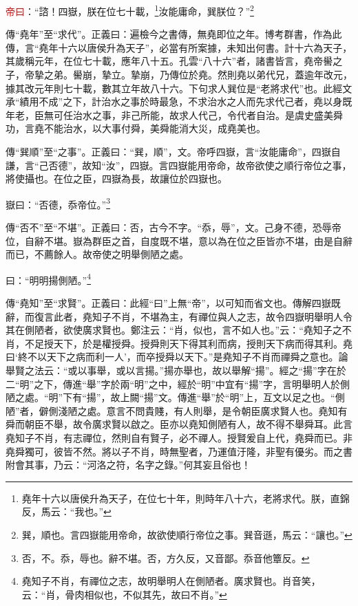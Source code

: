 \textcolor{red}{帝曰}：“諮！四嶽，朕在位七十載，\footnote{堯年十六以唐侯升為天子，在位七十年，則時年八十六，老將求代。朕，直錦反，馬云：“我也。”}汝能庸命，巽朕位？”\footnote{巽，順也。言四嶽能用帝命，故欲使順行帝位之事。巽音遜，馬云：“讓也。”}

{\noindent\zhuan{}\fzbyks 傳“堯年”至“求代”。正義曰：遍檢今之書傳，無堯即位之年。博考群書，作為此傳，言“堯年十六以唐侯升為天子”，必當有所案據，未知出何書。計十六為天子，其歲稱元年，在位七十載，應年八十五。孔雲“八十六”者，諸書皆言，堯帝嚳之子，帝摯之弟。嚳崩，摯立。摯崩，乃傳位於堯。然則堯以弟代兄，蓋逾年改元，據其改元年則七十載，數其立年故八十六。下句求人巽位是“老將求代”也。此經文承“績用不成”之下，計治水之事於時最急，不求治水之人而先求代己者，堯以身既年老，臣無可任治水之事，非己所能，故求人代己，令代者自治。是虞史盛美舜功，言堯不能治水，以大事付舜，美舜能消大災，成堯美也。 \par}

{\noindent\zhuan{}\fzbyks 傳“巽順”至“之事”。正義曰：“巽，順”，文。帝呼四嶽，言“汝能庸命”，四嶽自謙，言“己否德”，故知“汝”，四嶽。言四嶽能用帝命，故帝欲使之順行帝位之事，將使攝也。在位之臣，四嶽為長，故讓位於四嶽也。 \par}

嶽曰：“否德，忝帝位。”\footnote{否，不。忝，辱也。辭不堪。否，方久反，又音鄙。忝音他簟反。}

{\noindent\zhuan{}\fzbyks 傳“否不”至“不堪”。正義曰：否，古今不字。“忝，辱”，文。己身不德，恐辱帝位，自辭不堪。嶽為群臣之首，自度既不堪，意以為在位之臣皆亦不堪，由是自辭而已，不薦餘人。故帝使之明舉側陋之處。 \par}

曰：“明明揚側陋。”\footnote{堯知子不肖，有禪位之志，故明舉明人在側陋者。廣求賢也。肖音笑，云：“肖，骨肉相似也，不似其先，故曰不肖。”}

{\noindent\zhuan{}\fzbyks 傳“堯知”至“求賢”。正義曰：此經“曰”上無“帝”，以可知而省文也。傳解四嶽既辭，而復言此者，堯知子不肖，不堪為主，有禪位與人之志，故令四嶽明舉明人令其在側陋者，欲使廣求賢也。鄭注云：“肖，似也，言不如人也。”云：“堯知子之不肖，不足授天下，於是權授舜。授舜則天下得其利而病，授則天下病而得其利。堯曰‘終不以天下之病而利一人’，而卒授舜以天下。”是堯知子不肖而禪舜之意也。論舉賢之法云：“或以事舉，或以言揚。”揚亦舉也，故以舉解“揚”。經之“揚”字在於二“明”之下，傳進“舉”字於兩“明”之中，經於“明”中宜有“揚”字，言明舉明人於側陋之處。“明”下有“揚”，故上闕“揚”文。傳進“舉”於“明”上，互文以足之也。“側陋”者，僻側淺陋之處。意言不問貴賤，有人則舉，是令朝臣廣求賢人也。堯知有舜而朝臣不舉，故令廣求賢以啟之。臣亦以堯知側陋有人，故不得不舉舜耳。此言堯知子不肖，有志禪位，然則自有賢子，必不禪人。授賢爰自上代，堯舜而已。非堯舜獨可，彼皆不然。將以子不肖，時無聖者，乃運值汙隆，非聖有優劣。而之書附會其事，乃云：“河洛之符，名字之錄。”何其妄且俗也！ \par}

